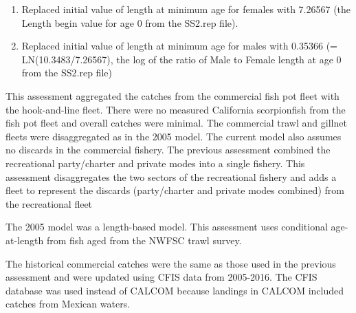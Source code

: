 \documentclass[12pt,]{article}
\begin{document}
\begin{enumerate}
 
 \item Replaced initial value of length at minimum age for females with 7.26567 (the Length begin value for age 
 0 from the SS2.rep file).
 
  \item Replaced initial value of length at minimum age for males with 0.35366 (= LN(10.3483/7.26567), the 
  log of the ratio of Male to Female length at age 0 from the SS2.rep file)

\end{enumerate}

This assessment aggregated the catches from the commercial fish pot
fleet with the hook-and-line fleet. There were no measured California
scorpionfish from the fish pot fleet and overall catches were minimal.
The commercial trawl and gillnet fleets were disaggregated as in the
2005 model. The current model also assumes no discards in the commercial
fishery. The previous assessment combined the recreational party/charter
and private modes into a single fishery. This assessment disaggregates
the two sectors of the recreational fishery and adds a fleet to
represent the discards (party/charter and private modes combined) from
the recreational fleet

The 2005 model was a length-based model. This assessment uses
conditional age-at-length from fish aged from the NWFSC trawl survey.

The historical commercial catches were the same as those used in the
previous assessment and were updated using CFIS data from 2005-2016. The
CFIS database was used instead of CALCOM because landings in CALCOM
included catches from Mexican waters.
\end{document}
